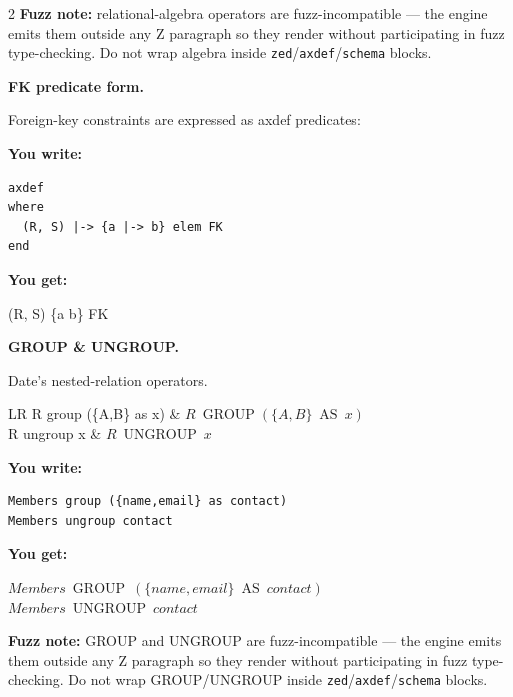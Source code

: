 \documentclass[10pt,landscape,a4paper]{article}
\newenvironment{exwrite}%
  {\par\nobreak\noindent\scriptsize\textbf{You write:}\par\nobreak\vspace{0pt}\scriptsize}%
  {\vspace{1pt}\nobreak}
\newenvironment{exget}%
  {\par\nobreak\noindent\scriptsize\textbf{You get:}\par\nobreak\vspace{0pt}\small}%
  {\par\vspace{3pt}}
\begin{document}
\begin{multicols}{2}
{\scriptsize\textbf{Fuzz note:} relational-algebra operators are fuzz-incompatible — the engine emits them outside any Z paragraph so they render without participating in fuzz type-checking. Do not wrap algebra inside \texttt{zed}/\texttt{axdef}/\texttt{schema} blocks.}

\smallskip
{}
\textbf{FK predicate form.}

{\scriptsize Foreign-key constraints are expressed as axdef predicates:}

\begin{exwrite}
\begin{verbatim}
axdef
where
  (R, S) |-> {a |-> b} elem FK
end
\end{verbatim}
\end{exwrite}
\begin{exget}%
\begin{axdef}
\where
(R, S) \mapsto \{a \mapsto b\} \in FK
\end{axdef}
\end{exget}

\smallskip
{}
\textbf{GROUP \& UNGROUP.}

{\scriptsize Date's nested-relation operators.}

\begin{tabularx}{\columnwidth}{LR}
R group (\{A,B\} as x) & $R\ \mathop{\mathrm{GROUP}} (\{A,B\}\ \mathop{\mathrm{AS}}\ x)$ \\
R ungroup x          & $R\ \mathop{\mathrm{UNGROUP}}\ x$ \\
\end{tabularx}

\begin{exwrite}
\begin{verbatim}
Members group ({name,email} as contact)
Members ungroup contact
\end{verbatim}
\end{exwrite}
\begin{exget}
\begin{center}
$Members\ \mathop{\mathrm{GROUP}}\ (\{name,email\}\ \mathop{\mathrm{AS}}\ contact)$\\[3pt]
$Members\ \mathop{\mathrm{UNGROUP}}\ contact$
\end{center}
\end{exget}

{\scriptsize\textbf{Fuzz note:} GROUP and UNGROUP are fuzz-incompatible — the engine emits them outside any Z paragraph so they render without participating in fuzz type-checking. Do not wrap GROUP/UNGROUP inside \texttt{zed}/\texttt{axdef}/\texttt{schema} blocks.}


\end{multicols}
\end{document}
